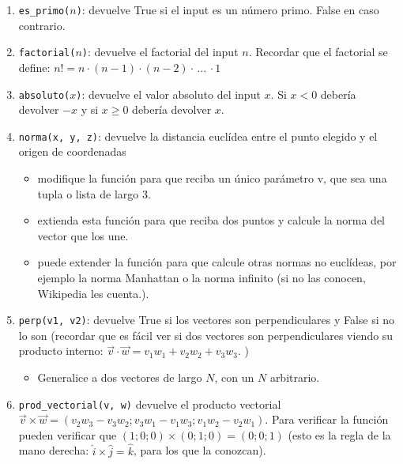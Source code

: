 \documentclass[a4paper]{article}
\begin{document}
\begin{enumerate}

\item \texttt{es\_primo($n$)}: devuelve True si el input es un número primo. False en caso contrario.

\item \texttt{factorial($n$)}: devuelve el factorial del input $n$. Recordar que el factorial se define: $n! = n\cdot(n-1)\cdot(n-2)\cdot \,\ldots\, \cdot1$

\item \texttt{absoluto($x$)}: devuelve el valor absoluto del input $x$. Si $x<0$ debería devolver $-x$ y si $x\ge 0$ debería devolver $x$.

\item \texttt{norma(x, y, z)}: devuelve la distancia euclídea entre el punto elegido y el origen de coordenadas

	\begin{itemize}
		\item modifique la función para que reciba un único parámetro v, que sea una tupla o lista de largo 3.
		\item extienda esta función para que reciba dos puntos y calcule la norma del vector que los une.
		\item puede extender la función para que calcule otras normas no euclídeas, por ejemplo la norma Manhattan o la norma infinito (si no las conocen, Wikipedia les cuenta.).
	\end{itemize}

\item \texttt{perp(v1, v2)}: devuelve True si los vectores son perpendiculares y False si no lo son (recordar que es fácil ver si dos vectores son perpendiculares viendo su producto interno: $\vec{v}\cdot \vec{w} = v_1w_1 + v_2w_2 + v_3 w_3$. )
	\begin{itemize}
		\item Generalice a dos vectores de largo $N$, con un $N$ arbitrario.
	\end{itemize}

\item \texttt{prod\_vectorial(v, w)} devuelve el producto vectorial $\vec{v}\times \vec{w} = (v_2 w_3 - v_3 w_2; v_3 w_1 - v_1 w_3; v_1 w_2 - v_2 w_1)$. Para verificar la función pueden verificar que $(1;0;0)\times (0;1;0) = (0;0;1)$ (esto es la regla de la mano derecha: $\hat{i} \times \hat{j} = \hat{k}$, para los que la conozcan).


\end{enumerate}
\end{document}
